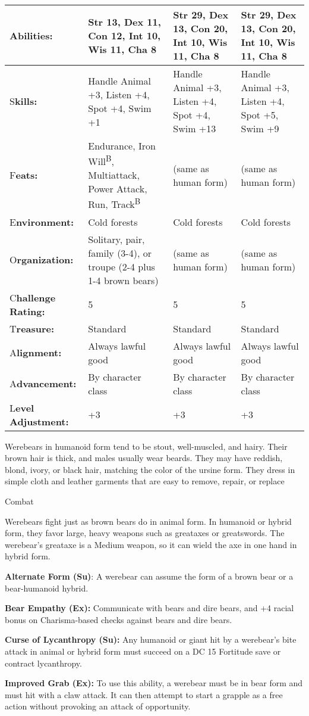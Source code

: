 \documentclass{article}
\begin{document}
\begin{tabular}{|>{\raggedright}p{67pt}|>{\raggedright}p{78pt}|>{\raggedright}p{78pt}|>{\raggedright}p{78pt}|}
A\textbf{bilities:} & Str 13, Dex 11, Con 12, Int 10, Wis 11, Cha 8 & Str 29, Dex 
13, Con 20, Int 10, Wis 11, Cha 8 & Str 29, Dex 13, Con 20, Int 10, Wis 11, Cha 
8\tabularnewline
\hline
S\textbf{kills:} & Handle Animal +3, Listen +4, Spot +4, Swim +1 & Handle Animal 
+3, Listen +4, Spot +4, Swim +13 & Handle Animal +3, Listen +4, Spot +5, Swim +9\tabularnewline
\hline
F\textbf{eats:} & Endurance, Iron Will\textsuperscript{B}, Multiattack, Power Attack, 
Run, Track\textsuperscript{B} & (same as human form) & (same as human form)\tabularnewline
\hline
E\textbf{nvironment:} & Cold forests & Cold forests & Cold forests\tabularnewline
\hline
O\textbf{rganization:} & Solitary, pair, family (3-4), or troupe (2-4 plus 1-4 
brown bears) & (same as human form) & (same as human form)\tabularnewline
\hline
C\textbf{hallenge Rating:} & 5 & 5 & 5\tabularnewline
\hline
T\textbf{reasure:} & Standard & Standard & Standard\tabularnewline
\hline
A\textbf{lignment:} & Always lawful good & Always lawful good & Always lawful good\tabularnewline
\hline
A\textbf{dvancement:} & By character class & By character class & By character 
class\tabularnewline
\hline
L\textbf{evel Adjustment:} & +3 & +3 & +3\tabularnewline
\hline
\end{tabular}

Werebears in humanoid form tend to be stout, well-muscled, and hairy. Their brown 
hair is thick, and males usually wear beards. They may have reddish, blond, ivory, 
or black hair, matching the color of the ursine form. They dress in simple cloth 
and leather garments that are easy to remove, repair, or replace

Combat

Werebears fight just as brown bears do in animal form. In humanoid or hybrid form, 
they favor large, heavy weapons such as greataxes or greatswords. The werebear's 
greataxe is a Medium weapon, so it can wield the axe in one hand in hybrid form.

\textbf{Alternate Form (Su)}: A werebear can assume the form of a brown bear or 
a bear-humanoid hybrid.

\textbf{Bear Empathy (Ex):} Communicate with bears and dire bears, and +4 racial 
bonus on Charisma-based checks against bears and dire bears.

\textbf{Curse of Lycanthropy (Su):} Any humanoid or giant hit by a werebear's bite 
attack in animal or hybrid form must succeed on a DC 15 Fortitude save or contract 
lycanthropy.

\textbf{Improved Grab (Ex):} To use this ability, a werebear must be in bear form 
and must hit with a claw attack. It can then attempt to start a grapple as a free 
action without provoking an attack of opportunity.
\end{document}
